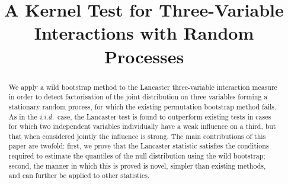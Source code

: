 \documentclass[]{article}
\title{A Kernel Test for Three-Variable Interactions with Random Processes}
\author{} %
\begin{document}
\maketitle

\begin{abstract} 

We apply a wild bootstrap method to the Lancaster three-variable interaction measure in order to detect factorisation of the joint distribution on three variables forming a stationary random process, for which the existing permutation bootstrap method fails. As in the \emph{i.i.d.}~case, the Lancaster test is found to outperform existing tests in cases for which two independent variables individually have a weak influence on a third, but that when considered jointly the influence is strong. The main contributions of this paper are twofold: first, we prove that the Lancaster statistic satisfies the conditions required to estimate the quantiles of the null distribution using the wild bootstrap; second, the manner in which this is proved is novel, simpler than existing methods, and can further be applied to other statistics.

\end{abstract} 
\end{document}
